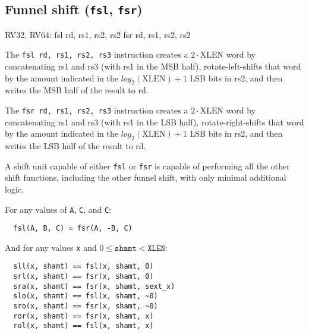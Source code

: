 

\subsection{Funnel shift ({\tt fsl}, {\tt fsr})}

\begin{rvb}
  RV32, RV64:
    fsl rd, rs1, rs2, rs2
    fsr rd, rs1, rs2, rs2
\end{rvb}

The {\tt fsl rd, rs1, rs2, rs3} instruction creates a $2\cdot\textrm{XLEN}$ word
by concatenating rs1 and rs3 (with rs1 in the MSB half), rotate-left-shifts that
word by the amount indicated in the $log_2(\textrm{XLEN})+1$ LSB bits in rs2, and
then writes the MSB half of the result to rd.

The {\tt fsr rd, rs1, rs2, rs3} instruction creates a $2\cdot\textrm{XLEN}$ word
by concatenating rs1 and rs3 (with rs1 in the LSB half), rotate-right-shifts that
word by the amount indicated in the $log_2(\textrm{XLEN})+1$ LSB bits in rs2, and
then writes the LSB half of the result to rd.





A shift unit capable of either {\tt fsl} or {\tt fsr} is capable of performing all
the other shift functions, including the other funnel shift, with only minimal additional
logic.

For any values of {\tt A}, {\tt C}, and {\tt C}:

\begin{minipage}{\linewidth}
\begin{verbatim}
  fsl(A, B, C) = fsr(A, -B, C)
\end{verbatim}
\end{minipage}

And for any values {\tt x} and $0 \le \texttt{shamt} < \texttt{XLEN}$:

\begin{minipage}{\linewidth}
\begin{verbatim}
  sll(x, shamt) == fsl(x, shamt, 0)
  srl(x, shamt) == fsr(x, shamt, 0)
  sra(x, shamt) == fsr(x, shamt, sext_x)
  slo(x, shamt) == fsl(x, shamt, ~0)
  sro(x, shamt) == fsr(x, shamt, ~0)
  ror(x, shamt) == fsr(x, shamt, x)
  rol(x, shamt) == fsl(x, shamt, x)
\end{verbatim}
\end{minipage}


